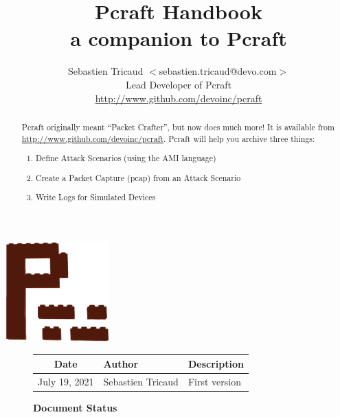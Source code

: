 \documentclass[10pt]{article}
\title{\color{PCFTorangedark} \textbf{Pcraft Handbook\\ a companion to Pcraft}}
\author{Sebastien Tricaud $<$sebastien.tricaud@devo.com$>$\\
  Lead Developer of Pcraft\\
  \url{http://www.github.com/devoinc/pcraft}
}
\begin{document}
\maketitle

\begin{center}
\includegraphics[width=4cm]{pcraft-logo.png}
\end{center}

\vspace{0.5in}

\begin{abstract}

\renewcommand{\epigraphflush}{center}
\begin{epigraphs}
\centering
\setlength{\epigraphwidth}{1.6\textwidth}
\end{epigraphs}

\vspace{1in}

Pcraft originally meant  ``Packet Crafter'', but now does much more! It is available from \url{http://www.github.com/devoinc/pcraft}. Pcraft will help you archive three things:
\begin{enumerate}
\item Define Attack Scenarios (using the AMI language)
\item Create a Packet Capture (pcap) from an Attack Scenario
\item Write Logs for Simulated Devices
\end{enumerate}

\end{abstract}

{
\begin{figure}
\begin{center}
\caption{\textbf{Document Status}}
{
\begin{tabular}{|c|l|l|}
\hline
\textbf{Date} & \textbf{Author} & \textbf{Description} \\
\hline
July 19, 2021 & Sebastien Tricaud & First version \\
\hline
\end{tabular}
}
\end{center}
\end{figure}
}
\end{document}
